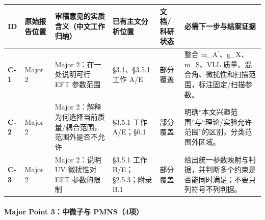 \documentclass[
  chinese,
  UTF8]{ctexart}
\newcounter{none} %
\begin{document}
{\def\LTcaptype{none} %
\begin{longtable}[]{@{}
  >{\raggedright\arraybackslash}p{}
  >{\raggedright\arraybackslash}p{}
  >{\raggedright\arraybackslash}p{}
  >{\raggedright\arraybackslash}p{}
  >{\raggedright\arraybackslash}p{}
  >{\raggedright\arraybackslash}p{}@{}}
\toprule\noalign{}
\begin{minipage}[b]{\linewidth}\raggedright
ID
\end{minipage} & \begin{minipage}[b]{\linewidth}\raggedright
原始报告位置
\end{minipage} & \begin{minipage}[b]{\linewidth}\raggedright
审稿意见的实质含义（中文工作归纳）
\end{minipage} & \begin{minipage}[b]{\linewidth}\raggedright
已有主文分析位置
\end{minipage} & \begin{minipage}[b]{\linewidth}\raggedright
文档/科研状态
\end{minipage} & \begin{minipage}[b]{\linewidth}\raggedright
必需下一步与结案证据
\end{minipage} \\
\midrule\noalign{}
\endhead
\bottomrule\noalign{}
\endlastfoot
\textbf{C-1} & Major 2 & Major 2：在一处说明可行 EFT 参数范围 &
§3.1、§3.5.1 工作 A/E & 部分覆盖 & 整合
m\_A\ensuremath{^\prime}、g\_X、m\_S、VLL
质量、混合角、微扰性和扫描范围，标注固定/扫描参数。 \\
\textbf{C-2} & Major 2 & Major
2：解释为何选择当前质量/耦合范围，范围外是否不允许 & §3.5.1 工作
A/E；§6.1 & 部分覆盖 &
明确``本文兴趣范围''与``理论/实验允许范围''的区别，分类范围外区域。 \\
\textbf{C-3} & Major 2 & Major 2：说明 UV 微扰性对 EFT 参数的限制 &
§3.5.1 工作 B/E；§2.5.3；附录 B.1 & 部分覆盖 &
给出统一参数映射与判据，并判断多个约束是否能同时满足；不要只列符号不列判据。 \\
\end{longtable}
}

\paragraph{Major Point 3：中微子与
PMNS（4项）}\label{major-point-3ux4e2dux5faeux5b50ux4e0e-pmns4ux9879}
\end{document}
